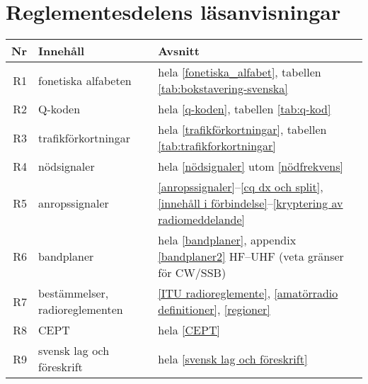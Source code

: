\newpage

\section{Reglementesdelens läsanvisningar}

\begin{table}[H]
\small
\begin{tabular}{rll}
\textbf{Nr} & \textbf{Innehåll} & \textbf{Avsnitt}\\ \hline\hline
R1 & fonetiska alfabeten & 
hela \ref{fonetiska_alfabet}, tabellen \ref{tab:bokstavering-svenska}\\ \hline
R2 & Q-koden &
hela \ref{q-koden}, tabellen \ref{tab:q-kod}\\ \hline
R3 & trafikförkortningar & 
hela \ref{trafikförkortningar}, tabellen \ref{tab:trafikforkortningar}\\ \hline
R4 & nödsignaler & 
hela \ref{nödsignaler} utom \ref{nödfrekvens}\\ \hline
R5 & anropssignaler & 
\ref{anropssignaler}--\ref{cq dx och split}, \ref{innehåll i förbindelse}--\ref{kryptering av radiomeddelande} \\ \hline
R6 & bandplaner &
hela \ref{bandplaner}, appendix \ref{bandplaner2} HF--UHF (veta gränser för CW/SSB)\\ \hline
R7 & bestämmelser, radioreglementen & 
\ref{ITU radioreglemente}, \ref{amatörradio definitioner}, \ref{regioner}\\ \hline
R8 & CEPT &
hela \ref{CEPT} \\ \hline
R9 & svensk lag och föreskrift & 
hela \ref{svensk lag och föreskrift} \\ \hline
\end{tabular}
\normalsize
\end{table}

\twocolumn
